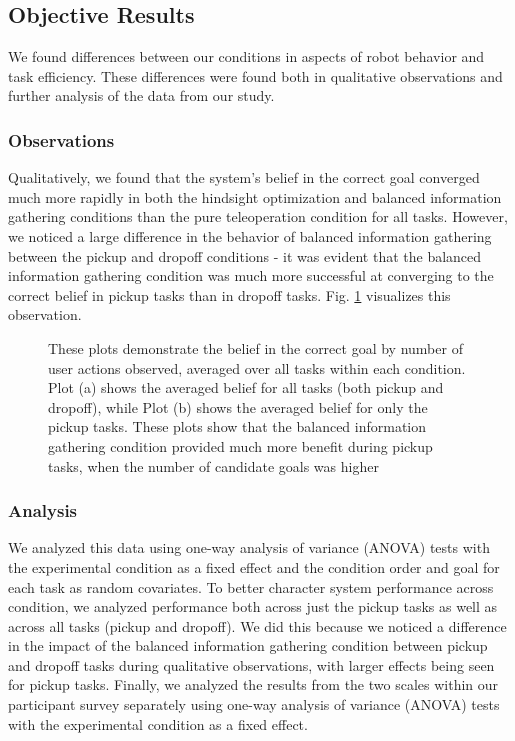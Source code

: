 \documentclass[conference]{IEEEtran}
\begin{document}
\subsection{Objective Results}

We found differences between our conditions in aspects of robot behavior and task efficiency. These differences were found both in qualitative observations and further analysis of the data from our study.

\subsubsection{Observations}
Qualitatively, we found that the system's belief in the correct goal converged much more rapidly in both the hindsight optimization and balanced information gathering conditions than the pure teleoperation condition for all tasks. However, we noticed a large difference in the behavior of balanced information gathering between the pickup and dropoff conditions - it was evident that the balanced information gathering condition was much more successful at converging to the correct belief in pickup tasks than in dropoff tasks. Fig. \ref{belief_graphs} visualizes this observation.

\begin{figure}
\caption{These plots demonstrate the belief in the correct goal by number of user actions observed, averaged over all tasks within each condition. Plot (a) shows the averaged belief for all tasks (both pickup and dropoff), while Plot (b) shows the averaged belief for only the pickup tasks. These plots show that the balanced information gathering condition provided much more benefit during pickup tasks, when the number of candidate goals was higher}
\label{belief_graphs}
\end{figure}

\subsubsection{Analysis}

We analyzed this data using one-way analysis of variance (ANOVA) tests with the experimental condition as a fixed effect and the condition order and goal for each task as random covariates. To better character system performance across condition, we analyzed performance both across just the pickup tasks as well as across all tasks (pickup and dropoff). We did this because we noticed a difference in the impact of the balanced information gathering condition between pickup and dropoff tasks during qualitative observations, with larger effects being seen for pickup tasks. Finally, we analyzed the results from the two scales within our participant survey separately using one-way analysis of variance (ANOVA) tests with the experimental condition as a fixed effect.
\end{document}
